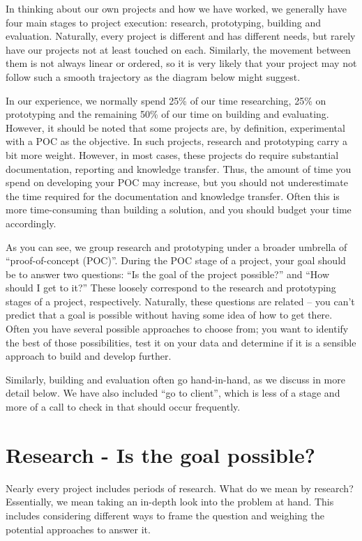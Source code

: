 \documentclass[
]{book}
\begin{document}
In thinking about our own projects and how we have worked, we generally
have four main stages to project execution: research, prototyping,
building and evaluation. Naturally, every project is different and has
different needs, but rarely have our projects not at least touched on
each. Similarly, the movement between them is not always linear or
ordered, so it is very likely that your project may not follow such a
smooth trajectory as the diagram below might suggest.

In our experience, we normally spend 25\% of our time researching, 25\%
on prototyping and the remaining 50\% of our time on building and
evaluating. However, it should be noted that some projects are, by
definition, experimental with a POC as the objective. In such projects,
research and prototyping carry a bit more weight. However, in most
cases, these projects do require substantial documentation, reporting
and knowledge transfer. Thus, the amount of time you spend on developing
your POC may increase, but you should not underestimate the time
required for the documentation and knowledge transfer. Often this is
more time-consuming than building a solution, and you should budget your
time accordingly.

As you can see, we group research and prototyping under a broader
umbrella of ``proof-of-concept (POC)''. During the POC stage of a
project, your goal should be to answer two questions: ``Is the goal of
the project possible?'' and ``How should I get to it?'' These loosely
correspond to the research and prototyping stages of a project,
respectively. Naturally, these questions are related -- you can't
predict that a goal is possible without having some idea of how to get
there. Often you have several possible approaches to choose from; you
want to identify the best of those possibilities, test it on your data
and determine if it is a sensible approach to build and develop further.

Similarly, building and evaluation often go hand-in-hand, as we discuss
in more detail below. We have also included ``go to client'', which is
less of a stage and more of a call to check in that should occur
frequently.

\hypertarget{research---is-the-goal-possible}{%
\section{Research - Is the goal
possible?}\label{research---is-the-goal-possible}}

Nearly every project includes periods of research. What do we mean by
research? Essentially, we mean taking an in-depth look into the problem
at hand. This includes considering different ways to frame the question
and weighing the potential approaches to answer it.
\end{document}
